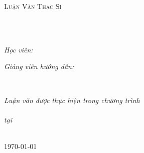 \documentclass[
12pt, %
oneside, %
english, %
onehalfspacing, %
nolistspacing, %
headsepline, %
addchap,
]{MastersDoctoralThesis} %
\author{Nguyễn Lê \textsc{Hoàng}} %
\begin{document}
\dominitoc
\frontmatter %

\pagestyle{plain} %


\begin{titlepage}
\begin{center}

\vspace*{.04\textheight}
{\scshape\LARGE \univname\par}\vspace{1.35cm} %
\textsc{\Large Luận Văn Thạc Sĩ}\\[0.2cm] %

\HRule \\[-0.1cm] %
{\huge \bfseries \ttitle\par}\vspace{0.1cm} %
\HRule \\[1cm] %
 
\begin{minipage}[t]{0.4\textwidth}
\begin{flushleft} \large
\emph{Học viên:}\\
\href{hoangnl.w@gmail.com}{\authorname} %
\end{flushleft}
\end{minipage}
\begin{minipage}[t]{0.4\textwidth}
\begin{flushright} \large
\emph{Giảng viên hướng dẫn:} \\
\href{mai.tathithanh@hust.edu.vn}{\supname} %
\end{flushright}
\end{minipage}\\[1.5cm] 
\vfill

\large \textit{Luận văn được thực hiện trong chương trình \\\degreename}\\ %
\textit{tại}\\
\facname \\[1cm] %
 
\vfill

{\large \today}\\[3.5cm] %
 
\vfill
\end{center}
\end{titlepage}
\end{document}
